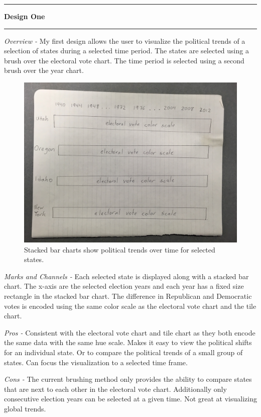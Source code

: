 \documentclass[11pt]{article}
\newcommand\question[1]{\vspace{.25in}\hrule\textbf{#1}\vspace{.5em}\hrule\vspace{.10in}}
\begin{document}
\raggedright
\newcommand\NAME{Jake Pitkin}  %
\newcommand\UID{u0891770}     %
\newcommand\HWNUM{3}              %

\question{Design One}

\textit{Overview -} My first design allows the user to visualize the political trends of a selection of states during a selected time period. The states are selected using a brush over the electoral vote chart. The time period is selected using a second brush over the year chart.

\begin{figure}[H]
  \centerline{\includegraphics[width=0.5\linewidth]{design_1.jpg}}
  \caption{Stacked bar charts show political trends over time for selected states.}
\end{figure}

\textit{Marks and Channels -} Each selected state is displayed along with a stacked bar chart. The x-axis are the selected election years and each year has a fixed size rectangle in the stacked bar chart. The difference in Republican and Democratic votes is encoded using the same color scale as the electoral vote chart and the tile chart.

\textit{Pros -} Consistent with the electoral vote chart and tile chart as they both encode the same data with the same hue scale. Makes it easy to view the political shifts for an individual state. Or to compare the political trends of a small group of states. Can focus the visualization to a selected time frame.

\textit{Cons -} The current brushing method only provides the ability to compare states that are next to each other in the electoral vote chart. Additionally only consecutive election years can be selected at a given time. Not great at visualizing global trends.
\end{document}
